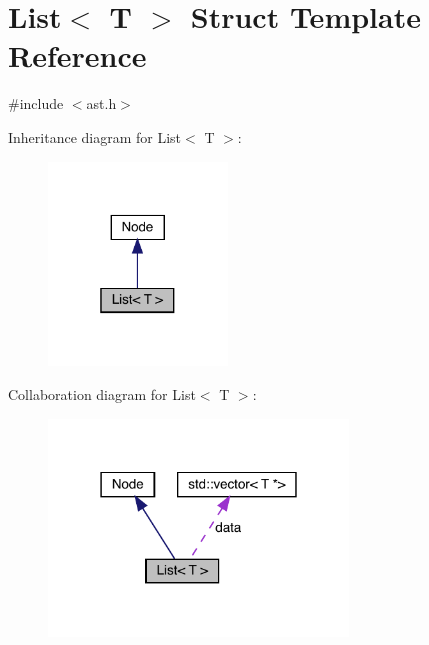 \hypertarget{struct_list}{}\section{List$<$ T $>$ Struct Template Reference}
\label{struct_list}


{\ttfamily \#include $<$ast.\+h$>$}



Inheritance diagram for List$<$ T $>$\+:\nopagebreak
\begin{figure}[H]
\begin{center}
\leavevmode
\includegraphics[width=135pt]{struct_list__inherit__graph}
\end{center}
\end{figure}


Collaboration diagram for List$<$ T $>$\+:\nopagebreak
\begin{figure}[H]
\begin{center}
\leavevmode
\includegraphics[width=226pt]{struct_list__coll__graph}
\end{center}
\end{figure}
